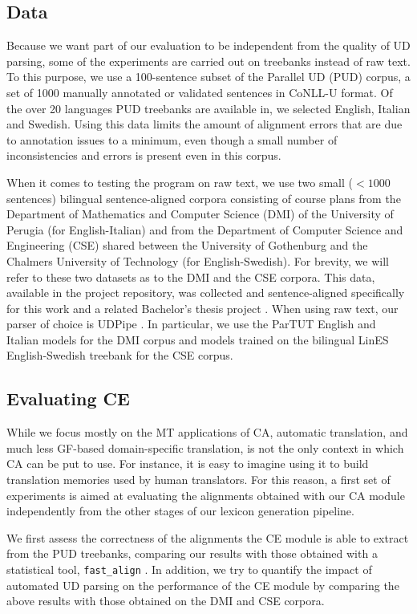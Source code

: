 \documentclass[11pt]{article}
\begin{document}
\subsection{Data} \label{data}
Because we want part of our evaluation to be independent from the quality of UD parsing, some of the experiments are carried out on treebanks instead of raw text. 
To this purpose, we use a 100-sentence subset of the Parallel UD (PUD) corpus, a set of 1000 manually annotated or validated sentences in CoNLL-U format.
Of the over 20 languages PUD treebanks are available in, we selected English, Italian and Swedish. 
Using this data limits the amount of alignment errors that are due to annotation issues to a minimum, even though a small number of inconsistencies and errors is present even in this corpus.

When it comes to testing the program on raw text, we use two small ($< 1000$ sentences) bilingual sentence-aligned corpora consisting of course plans from the Department of Mathematics and Computer Science (DMI) of the University of Perugia (for English-Italian) and from the Department of Computer Science and Engineering (CSE) shared between the University of Gothenburg and the Chalmers University of Technology (for English-Swedish). 
For brevity, we will refer to these two datasets as to the DMI and the CSE corpora.
This data, available in the project repository, was collected and sentence-aligned specifically for this work and a related Bachelor's thesis project \cite{thesis}.
When using raw text, our parser of choice is UDPipe \cite{straka-etal-2016-udpipe}. 
In particular, we use the ParTUT English and Italian models for the DMI corpus and models trained on the bilingual LinES English-Swedish treebank for the CSE corpus.

\subsection{Evaluating CE} \label{ceval}
While we focus mostly on the MT applications of CA, automatic translation, and much less GF-based domain-specific translation, is not the only context in which CA can be put to use. 
For instance, it is easy to imagine using it to build translation memories used by human translators.
For this reason, a first set of experiments is aimed at evaluating the alignments obtained with our CA module independently from the other stages of our lexicon generation pipeline.

We first assess the correctness of the alignments the CE module is able to extract from the PUD treebanks, comparing our results with those obtained with a statistical tool, \texttt{fast\_align} \cite{dyer-etal-2013-simple}. 
In addition, we try to quantify the impact of automated UD parsing on the performance of the CE module by comparing the above results with those obtained on the DMI and CSE corpora.
\end{document}
